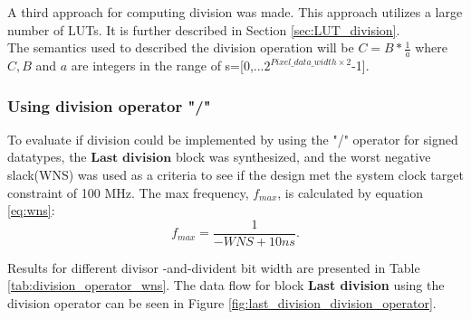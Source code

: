 A third approach for computing division was made. This approach utilizes a large number of LUTs. It is further described in Section \ref{sec:LUT_division}.\\

 The semantics used to described the division operation will be $C=B*\frac{1}{a}$ where $C,B$ and $a$ are integers in the range of s=[0,...$2^{Pixel\_data\_width \times 2}$-1]. %


\subsubsection{Using division operator "/"}
\label{sec:division_operator}




To evaluate if division could be implemented by using the "/" operator for signed datatypes, the $\textbf{Last division}$ block was synthesized, and the worst negative slack(WNS) was used as a criteria to see if the design met the system clock target constraint of 100 MHz. 
The max frequency, $f_{max}$, is calculated by equation \ref{eq:wns}:  
\begin{equation}
f_{max}=\frac{1}{-WNS+10ns}. 
\label{eq:wns}
\end{equation}

 Results for different divisor -and-divident bit width are presented in Table \ref{tab:division_operator_wns}. The data flow for block \textbf{Last division} using the division operator can be seen in Figure \ref{fig:last_division_division_operator}.



